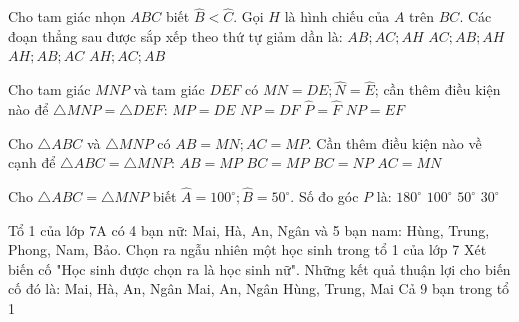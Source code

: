 \begin{ex}
	Cho tam giác nhọn $ABC$ biết $\widehat{B} < \widehat{C}$. Gọi $H$ là hình chiếu của $A$ trên $BC$. Các đoạn thẳng sau được sắp xếp theo thứ tự giảm dần là:
	\choice
	{$AB; AC; AH$}
	{$AC; AB; AH$}
	{$AH; AB; AC$}
	{$AH; AC; AB$}
	\loigiai{}
\end{ex}
\begin{ex}
	Cho tam giác $MNP$ và tam giác $DEF$ có $MN=DE; \widehat{N}=\widehat{E}$; cần thêm điều kiện nào để $\triangle MNP=\triangle DEF$:
	\choice
	{$MP=DE$}
	{$NP=DF$}
	{$\widehat{P}=\widehat{F}$}
	{$NP=EF$}
	\loigiai{}
\end{ex}
\begin{ex}
	\loigiai{}
\end{ex}

\begin{ex}
	Cho $\triangle ABC$ và $\triangle MNP$ có $AB=MN; AC=MP$. Cần thêm điều kiện nào về cạnh để $\triangle ABC=\triangle MNP$:
	\choice
	{$AB=MP$}
	{$BC=MP$}
	{$BC=NP$}
	{$AC=MN$}
	\loigiai{}
\end{ex}
\begin{ex}
	Cho $\triangle ABC=\triangle MNP$ biết $\widehat{A}=100^{\circ}; \widehat{B}=50^{\circ}$. Số đo góc $P$ là:
	\choice
	{$180^{\circ}$}
	{$100^{\circ}$}
	{$50^{\circ}$}
	{$30^{\circ}$}
\loigiai{}
\end{ex}
\begin{ex}
	Tổ 1 của lớp 7A có 4 bạn nữ: Mai, Hà, An, Ngân và 5 bạn nam: Hùng, Trung, Phong, Nam, Bảo. Chọn ra ngẫu nhiên một học sinh trong tổ 1 của lớp 7
	Xét biến cố "Học sinh được chọn ra là học sinh nữ". Những kết quả thuận lợi cho biến cố đó là:
		\choice
		{Mai, Hà, An, Ngân}
		{Mai, An, Ngân}
		{Hùng, Trung, Mai}
		{Cả 9 bạn trong tổ 1}
		\loigiai{}
\end{ex}

